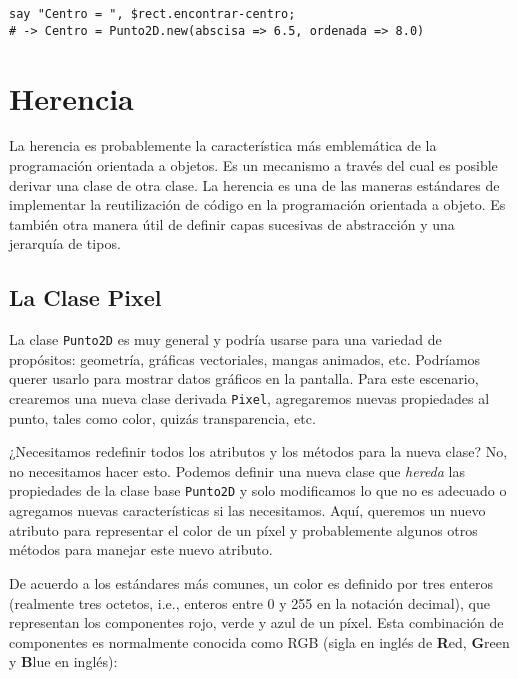 \begin{verbatim}
say "Centro = ", $rect.encontrar-centro;
# -> Centro = Punto2D.new(abscisa => 6.5, ordenada => 8.0)
\end{verbatim}
%

\section{Herencia}

La herencia es probablemente la característica más 
emblemática de la programación orientada a objetos.
Es un mecanismo a través del cual es posible derivar una
clase de otra clase. La herencia es una de las maneras 
estándares de implementar la reutilización de código en la
programación orientada a objeto. Es también otra manera útil 
de definir capas sucesivas de abstracción y una 
jerarquía de tipos.

\subsection{La Clase Pixel}

La clase {\tt Punto2D} es muy general y podría usarse para
una variedad de propósitos: geometría, gráficas vectoriales, 
mangas animados, etc. Podríamos querer usarlo para mostrar 
datos gráficos en la pantalla. Para este escenario, crearemos
una nueva clase derivada {\tt Pixel}, agregaremos nuevas 
propiedades al punto, tales como color, quizás transparencia, etc.

¿Necesitamos redefinir todos los atributos y los métodos para la 
nueva clase? No, no necesitamos hacer esto. Podemos definir una 
nueva clase que \emph{hereda} las propiedades de la clase base 
{\tt Punto2D} y solo modificamos lo que no es adecuado o agregamos nuevas
características si las necesitamos. Aquí, queremos un nuevo
atributo para representar el color de un píxel y probablemente
algunos otros métodos para manejar este nuevo atributo.

De acuerdo a los estándares más comunes, un color es definido
por tres enteros (realmente tres octetos, i.e., enteros entre 
0 y 255 en la notación decimal), que representan los componentes
rojo, verde y azul de un píxel. Esta combinación de componentes es normalmente
conocida como RGB (sigla en inglés de {\bf R}ed, {\bf G}reen y {\bf B}lue en inglés):

